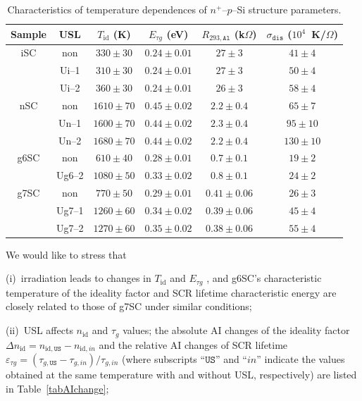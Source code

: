 \documentclass[aip,jap, amsmath,amssymb,reprint]{revtex4-1}
\begin{document}
\begin{table}
\caption{\label{tabTpar}Characteristics of temperature dependences of $n^+$--$p$--Si structure parameters.
}
\begin{ruledtabular}
\begin{tabular}{cccccc}
Sample&USL&$T_{\mathrm{id}}$ (K)&$E_{\tau g}$ (eV)&$R_{293,\mathtt{Al}}$ (k$\Omega$)&$\sigma_{\mathtt{dis}}$ ($10^4$~K/$\Omega$)\\
\hline
iSC&non&$330\pm30$&$0.24\pm0.01$&$27\pm3$&$41\pm4$\\
&Ui--1&$310\pm30$&$0.24\pm0.01$&$27\pm3$&$50\pm4$\\
&Ui--2&$360\pm30$&$0.24\pm0.01$&$26\pm3$&$58\pm4$\\
nSC&non&$1610\pm70$&$0.45\pm0.02$&$2.2\pm0.4$&$65\pm7$\\
&Un--1&$1600\pm70$&$0.44\pm0.02$&$2.3\pm0.4$&$95\pm10$\\
&Un--2&$1680\pm70$&$0.44\pm0.02$&$2.2\pm0.4$&$130\pm10$\\
g6SC&non&$610\pm40$&$0.28\pm0.01$&$0.7\pm0.1$&$19\pm2$\\
&Ug6--2&$1080\pm50$&$0.33\pm0.02$&$0.8\pm0.1$&$24\pm2$\\
g7SC&non&$770\pm50$&$0.29\pm0.01$&$0.41\pm0.06$&$26\pm3$\\
&Ug7--1&$1260\pm60$&$0.34\pm0.02$&$0.39\pm0.06$&$45\pm4$\\
&Ug7--2&$1270\pm60$&$0.35\pm0.02$&$0.38\pm0.06$&$55\pm4$\\
\end{tabular}
\end{ruledtabular}
\end{table}

We would like to stress that

\noindent
(i)~irradiation leads to changes in $T_{\mathrm{id}}$ and $E_{\tau g}$ , and g6SC's characteristic temperature of the ideality factor and SCR lifetime characteristic energy are closely related to those of g7SC under similar conditions;

\noindent
(ii)~USL affects $n_{\mathrm{id}}$ and $\tau_g$ values;
the absolute AI changes of the ideality factor $\Delta n_{\mathrm{id}}=n_{\mathrm{id},\mathtt{US}}-n_{\mathrm{id},in}$ and
the relative AI changes of SCR lifetime $\varepsilon_{\tau g}=(\tau_{g,\mathtt{US}}-\tau_{g,in})/\tau_{g,in}$
(where subscripts ``$\mathtt{US}$'' and ``$in$'' indicate the values
obtained at the same temperature with and without USL, respectively)
are listed in Table~\ref{tabAIchange};
\end{document}
